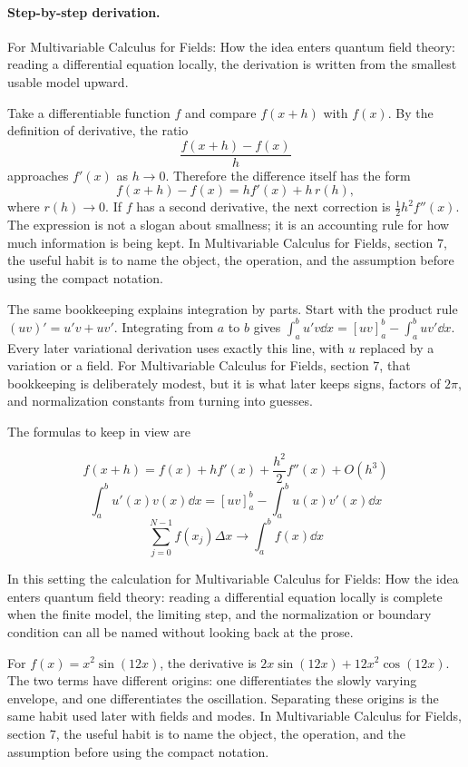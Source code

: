 \paragraph{Step-by-step derivation.}

For Multivariable Calculus for Fields: How the idea enters quantum field theory: reading a differential equation locally, the derivation is written from the smallest usable model upward.

Take a differentiable function \(f\) and compare \(f(x+h)\) with \(f(x)\).  By the definition of derivative, the ratio
\[
  \frac{f(x+h)-f(x)}{h}
\]
approaches \(f'(x)\) as \(h\to0\).  Therefore the difference itself has the form
\[
  f(x+h)-f(x)=hf'(x)+h\,r(h),
\]
where \(r(h)\to0\).  If \(f\) has a second derivative, the next correction is \(\frac12h^2f''(x)\).  The expression is not a slogan about smallness; it is an accounting rule for how much information is being kept.  In Multivariable Calculus for Fields, section 7, the useful habit is to name the object, the operation, and the assumption before using the compact notation.

The same bookkeeping explains integration by parts.  Start with the product rule \((uv)'=u'v+uv'\).  Integrating from \(a\) to \(b\) gives \(\int_a^b u'v\dd x=[uv]_a^b-\int_a^buv'\dd x\).  Every later variational derivation uses exactly this line, with \(u\) replaced by a variation or a field.  For Multivariable Calculus for Fields, section 7, that bookkeeping is deliberately modest, but it is what later keeps signs, factors of \(2\pi\), and normalization constants from turning into guesses.

The formulas to keep in view are

\[
  f(x+h)=f(x)+hf'(x)+\frac{h^2}{2}f''(x)+O(h^3)
\]
\[
  \int_a^b u'(x)v(x)\dd x=[uv]_a^b-\int_a^b u(x)v'(x)\dd x
\]
\[
  \sum_{j=0}^{N-1}f(x_j)\Delta x\longrightarrow \int_a^b f(x)\dd x
\]

In this setting the calculation for Multivariable Calculus for Fields: How the idea enters quantum field theory: reading a differential equation locally is complete when the finite model, the limiting step, and the normalization or boundary condition can all be named without looking back at the prose.




\begin{example}
For \(f(x)=x^2\sin(12x)\), the derivative is \(2x\sin(12x)+12x^2\cos(12x)\).  The two terms have different origins: one differentiates the slowly varying envelope, and one differentiates the oscillation.  Separating these origins is the same habit used later with fields and modes.  In Multivariable Calculus for Fields, section 7, the useful habit is to name the object, the operation, and the assumption before using the compact notation.
\end{example}



